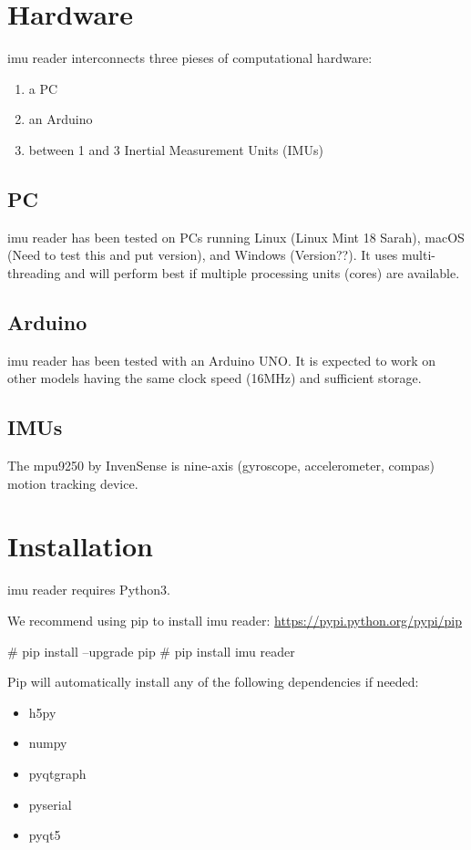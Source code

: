 \documentclass[11pt,letterpaper,article]{memoir}
\newcommand{\name}{imu reader}
\begin{document}
\section{Hardware}

\name{} interconnects three pieses of computational hardware:
\begin{enumerate}
  \item a PC
  \item an Arduino
  \item between 1 and 3 Inertial Measurement Units (IMUs)
\end{enumerate}

\subsection{PC}
\name{} has been tested on PCs running Linux (Linux Mint 18 Sarah), macOS (Need to test this and
put version), and Windows (Version??). It uses multi-threading and will perform
best if multiple processing units (cores) are available.

\subsection{Arduino}
\name{} has been tested with an Arduino UNO. It is expected to work on other models having
the same clock speed (16MHz) and sufficient storage.

\subsection{IMUs}
The mpu9250 by InvenSense is nine-axis (gyroscope, accelerometer, compas) motion tracking device.







\section{Installation}

\name{} requires Python3.

We recommend using pip to install \name{}:
\url{https://pypi.python.org/pypi/pip}

\# pip install --upgrade pip
\# pip install \name

Pip will automatically install any of the following dependencies if needed:
\begin{itemize}
\item h5py
\item numpy
\item pyqtgraph
\item pyserial
\item pyqt5
\end{itemize}
\end{document}
